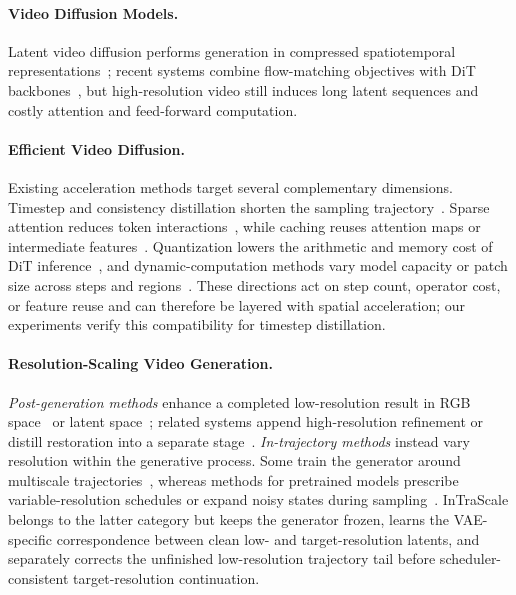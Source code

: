 \documentclass[letterpaper]{article} %
\begin{document}
\paragraph{Video Diffusion Models.}
Latent video diffusion performs generation in compressed spatiotemporal
representations~\citep{blattmann2023videoldm}; recent systems combine
flow-matching objectives with DiT backbones~\citep{jin2025pyramidalflow,wan2025},
but high-resolution video still induces long latent sequences and costly
attention and feed-forward computation.

\paragraph{Efficient Video Diffusion.}
Existing acceleration methods target several complementary dimensions.
Timestep and consistency distillation shorten the sampling
trajectory~\citep{wang2023videolcm,li2024t2vturbo,ding2025dollar,nie2026tmd}.
Sparse attention reduces token interactions~\citep{xi2025sparsevideogen},
while caching reuses attention maps or intermediate
features~\citep{zhao2025pab,liu2025teacache,zou2026disca}. Quantization lowers
the arithmetic and memory cost of DiT inference~\citep{zhao2025viditq}, and
dynamic-computation methods vary model capacity or patch size across steps and
regions~\citep{anagnostidis2025flexidit,kim2026ddit,li2026dynapatch}. These
directions act on step count, operator cost, or feature reuse and can therefore
be layered with spatial acceleration; our experiments verify this
compatibility for timestep distillation.

\paragraph{Resolution-Scaling Video Generation.}
\emph{Post-generation methods} enhance a completed low-resolution result in
RGB space~\citep{zhou2024upscale,xu2024videogigagan,he2024venhancer} or latent
space~\citep{xie2025simplegvr,zhao2026luve}; related systems append
high-resolution refinement or distill restoration into a separate
stage~\citep{zheng2026mrflow,zhuang2026flashvsr}. \emph{In-trajectory methods}
instead vary resolution within the generative process. Some train the generator
around multiscale trajectories~\citep{gu2024matryoshka,jin2025pyramidalflow},
whereas methods for pretrained models prescribe variable-resolution schedules
or expand noisy states during sampling~\citep{jeong2025ralu,lightx2v2026,
zheng2026fresco,xiao2026spectral}. InTraScale belongs to the latter category
but keeps the generator frozen, learns the VAE-specific correspondence between
clean low- and target-resolution latents, and separately corrects the
unfinished low-resolution trajectory tail before scheduler-consistent
target-resolution continuation.
\end{document}
